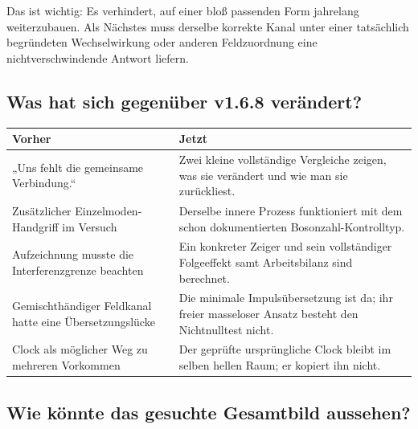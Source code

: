 \documentclass[
  ngerman,
  10pt,
  a4paper,
]{article}
\newcounter{none} %
\begin{document}
Das ist wichtig: Es verhindert, auf einer bloß passenden Form jahrelang
weiterzubauen. Als Nächstes muss derselbe korrekte Kanal unter einer
tatsächlich begründeten Wechselwirkung oder anderen Feldzuordnung eine
nichtverschwindende Antwort liefern.

\subsection{Was hat sich gegenüber v1.6.8
verändert?}\label{was-hat-sich-gegenuxfcber-v1.6.8-veruxe4ndert}

{\def\LTcaptype{none} %
\begin{longtable}[]{@{}
  >{\raggedright\arraybackslash}p{}
  >{\raggedright\arraybackslash}p{}@{}}
\toprule\noalign{}
\begin{minipage}[b]{\linewidth}\raggedright
Vorher
\end{minipage} & \begin{minipage}[b]{\linewidth}\raggedright
Jetzt
\end{minipage} \\
\midrule\noalign{}
\endhead
\bottomrule\noalign{}
\endlastfoot
„Uns fehlt die gemeinsame Verbindung.`` & Zwei kleine vollständige
Vergleiche zeigen, was sie verändert und wie man sie zurückliest. \\
Zusätzlicher Einzelmoden-Handgriff im Versuch & Derselbe innere Prozess
funktioniert mit dem schon dokumentierten Bosonzahl-Kontrolltyp. \\
Aufzeichnung musste die Interferenzgrenze beachten & Ein konkreter
Zeiger und sein vollständiger Folgeeffekt samt Arbeitsbilanz sind
berechnet. \\
Gemischthändiger Feldkanal hatte eine Übersetzungslücke & Die minimale
Impulsübersetzung ist da; ihr freier masseloser Ansatz besteht den
Nichtnulltest nicht. \\
Clock als möglicher Weg zu mehreren Vorkommen & Der geprüfte
ursprüngliche Clock bleibt im selben hellen Raum; er kopiert ihn
nicht. \\
\end{longtable}
}

\subsection{Wie könnte das gesuchte Gesamtbild
aussehen?}\label{wie-kuxf6nnte-das-gesuchte-gesamtbild-aussehen}
\end{document}
